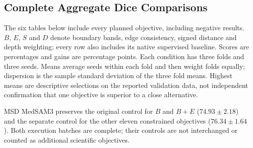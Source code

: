 \documentclass[12pt,a4paper]{article}
\begin{document}
\subsection{Complete Aggregate Dice Comparisons}
\label{sec:complete-result-tables}\label{sec:secondary-objective-results}

The six tables below include every planned objective, including negative
results. $B$, $E$, $S$ and $D$ denote boundary bands, edge consistency,
signed distance and depth weighting; every row also includes its native
supervised baseline. Scores are percentages and gains are percentage
points. Each condition has three folds and three seeds. Means average
seeds within each fold and then weight folds equally; dispersion is the
sample standard deviation of the three fold means. Highest means are
descriptive selections on the reported validation data, not independent
confirmation that one objective is superior to a close alternative.

MSD MedSAM3 preserves the original control for $B$ and $B+E$
($74.93\pm2.18$) and the separate control for the other eleven
constrained objectives ($76.34\pm1.64$). Both execution batches are
complete; their controls are not interchanged or counted as additional
scientific objectives.
\end{document}
